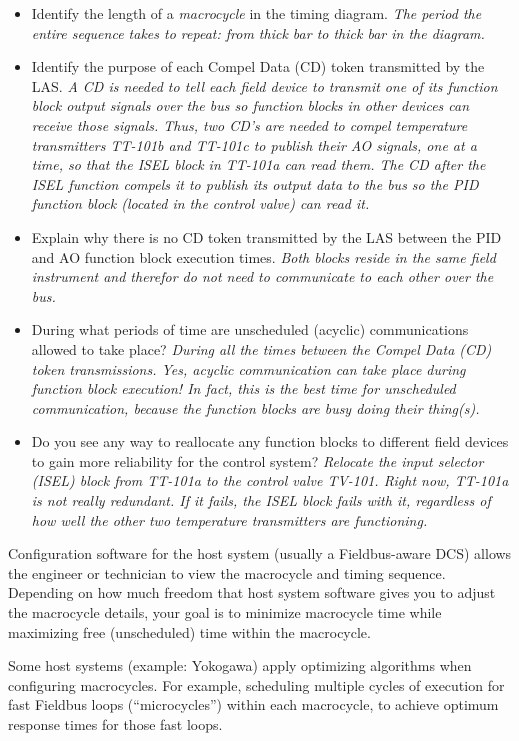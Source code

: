 \begin{itemize}
\item{} Identify the length of a {\it macrocycle} in the timing diagram.  {\it The period the entire sequence takes to repeat: from thick bar to thick bar in the diagram.}
\vskip 5pt
\item{} Identify the purpose of each Compel Data (CD) token transmitted by the LAS.  {\it A CD is needed to tell each field device to transmit one of its function block output signals over the bus so function blocks in other devices can receive those signals.  Thus, two CD's are needed to compel temperature transmitters TT-101b and TT-101c to publish their AO signals, one at a time, so that the ISEL block in TT-101a can read them.  The CD after the ISEL function compels it to publish its output data to the bus so the PID function block (located in the control valve) can read it.}
\vskip 5pt
\item{} Explain why there is no CD token transmitted by the LAS between the PID and AO function block execution times.  {\it Both blocks reside in the same field instrument and therefor do not need to communicate to each other over the bus.}
\vskip 5pt
\item{} During what periods of time are unscheduled (acyclic) communications allowed to take place?  {\it During all the times between the Compel Data (CD) token transmissions.  Yes, acyclic communication can take place during function block execution!  In fact, this is the best time for unscheduled communication, because the function blocks are busy doing their thing(s).}
\vskip 5pt
\item{} Do you see any way to reallocate any function blocks to different field devices to gain more reliability for the control system?  {\it Relocate the input selector (ISEL) block from TT-101a to the control valve TV-101.  Right now, TT-101a is not really redundant.  If it fails, the ISEL block fails with it, regardless of how well the other two temperature transmitters are functioning.}
\end{itemize}

Configuration software for the host system (usually a Fieldbus-aware DCS) allows the engineer or technician to view the macrocycle and timing sequence.  Depending on how much freedom that host system software gives you to adjust the macrocycle details, your goal is to minimize macrocycle time while maximizing free (unscheduled) time within the macrocycle.  

Some host systems (example: Yokogawa) apply optimizing algorithms when configuring macrocycles.  For example, scheduling multiple cycles of execution for fast Fieldbus loops (``microcycles'') within each macrocycle, to achieve optimum response times for those fast loops.

